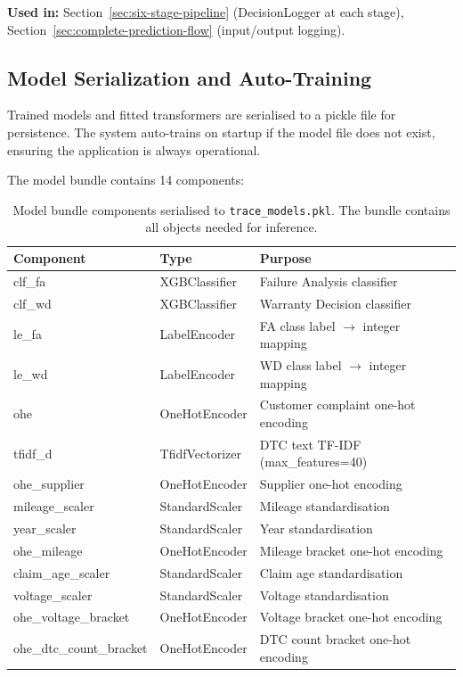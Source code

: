 \documentclass[10pt,a4paper]{article}
\begin{document}
\textbf{Used in:} Section~\ref{sec:six-stage-pipeline} (DecisionLogger at each stage), Section~\ref{sec:complete-prediction-flow} (input/output logging).

\subsection{Model Serialization and Auto-Training}
\label{sec:model-serialization}

Trained models and fitted transformers are serialised to a pickle file for persistence. The system auto-trains on startup if the model file does not exist, ensuring the application is always operational.

The model bundle contains 14 components:

\begin{table}[H]
\centering
\caption{Model bundle components serialised to \texttt{trace\_models.pkl}. The bundle contains all objects needed for inference.}
\label{tab:model-bundle}
\begin{tabular}{lR{4cm}R{5cm}}
\toprule
\textbf{Component} & \textbf{Type} & \textbf{Purpose} \\
\midrule
clf\_fa                & XGBClassifier & Failure Analysis classifier \\
clf\_wd                & XGBClassifier & Warranty Decision classifier \\
le\_fa                 & LabelEncoder  & FA class label $\to$ integer mapping \\
le\_wd                 & LabelEncoder  & WD class label $\to$ integer mapping \\
ohe                    & OneHotEncoder & Customer complaint one-hot encoding \\
tfidf\_d               & TfidfVectorizer & DTC text TF-IDF (max\_features=40) \\
ohe\_supplier          & OneHotEncoder & Supplier one-hot encoding \\
mileage\_scaler        & StandardScaler & Mileage standardisation \\
year\_scaler           & StandardScaler & Year standardisation \\
ohe\_mileage           & OneHotEncoder & Mileage bracket one-hot encoding \\
claim\_age\_scaler     & StandardScaler & Claim age standardisation \\
voltage\_scaler        & StandardScaler & Voltage standardisation \\
ohe\_voltage\_bracket  & OneHotEncoder & Voltage bracket one-hot encoding \\
ohe\_dtc\_count\_bracket & OneHotEncoder & DTC count bracket one-hot encoding \\
\bottomrule
\end{tabular}
\end{table}
\end{document}
